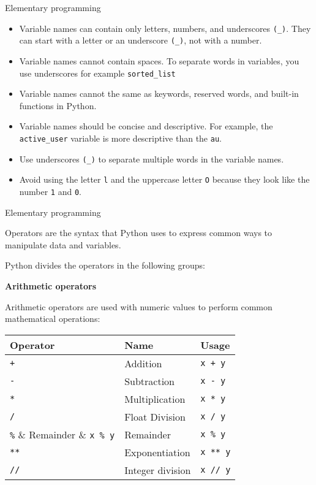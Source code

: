 \begin{frame}[fragile]{Elementary programming}
    \begin{itemize}[<+->]
        \item Variable names can contain only letters, numbers, and underscores \verb|(_)|.
         They can start with a letter or an underscore \verb|(_)|, not with a number.
        \item Variable names cannot contain spaces. To separate words in variables, you use underscores for example \verb|sorted_list|
        \item Variable names cannot the same as keywords, reserved words, and built-in functions in Python.
        \end{itemize}
        \begin{itemize}[<+->]
            \item Variable names should be concise and descriptive. For example, the \verb|active_user| variable is more descriptive than the \verb|au|.
            \item Use underscores \verb|(_)| to separate multiple words in the variable names.
            \item Avoid using the letter \verb|l| and the uppercase letter \verb|O| because they look like the number \verb|1| and \verb|0|.
        \end{itemize}
\end{frame}
\begin{frame}[fragile]{Elementary programming}
    \begin{block}{}
        Operators are the syntax that Python uses to express common ways to manipulate
data and variables.
    \end{block}
    Python divides the operators in the following groups:
    \begin{center}{\bf Arithmetic operators}\end{center}
    Arithmetic operators are used with numeric values to perform common mathematical operations:
    \begin{center}
        \begin{tabular}{ |  p{3cm} | p{3cm} | p{3cm} |}
            \hline
            Operator &Name&Usage\\
            \hline
        \verb|+| & Addition & \verb|x + y|\\  
        \verb|-| & Subtraction & \verb|x - y|\\  
        \verb|*| & Multiplication & \verb|x * y|\\  
        \verb|/| & Float Division & \verb|x / y|\\  
        \verb|%| & Remainder & \verb|x % y|\\  
        \verb|**| & Exponentiation & \verb|x ** y|\\  
        \verb|//| & Integer division & \verb|x // y|\\
        \hline
        \end{tabular}
    \end{center}
\end{frame}
